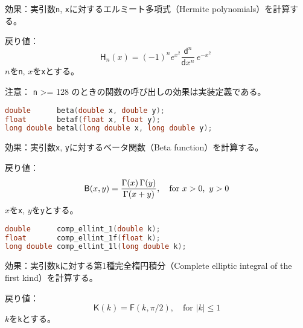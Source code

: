 \noindent
\textsf{効果}：実引数\lstinline!n!,
\lstinline!x!に対するエルミート多項式（Hermite polynomials）を計算する。

\noindent
\textsf{戻り値}：
\[
  \mathsf{H}_n(x) =
  (-1)^n e^{x^2} \frac{ \mathsf{d} ^n}
              { \mathsf{d}x^n} \, e^{-x^2}
\;
\]
\hspace*{3em}\(n\)を\lstinline!n!, \(x\)を\lstinline!x!とする。

\noindent
\textsf{注意}： \lstinline!n! \textgreater{}= 128
のときの関数の呼び出しの効果は実装定義である。

%

\bgroup
\begin{lstlisting}[language=C++, aboveskip=0.0zw]
double      beta(double x, double y);
float       betaf(float x, float y);
long double betal(long double x, long double y);
\end{lstlisting}
\egroup

\noindent
\textsf{効果}：実引数\lstinline!x!,
\lstinline!y!に対するベータ関数（Beta function）を計算する。

\noindent
\textsf{戻り値}：
\[
  \mathsf{B}(x, y) =
  \frac{ \Gamma(x) \, \Gamma(y) }
       { \Gamma(x+y) },
       \quad \mbox{for $x > 0$,\, $y > 0$}
\]
\hspace*{3em}\(x\)を\lstinline!x!, \(y\)を\lstinline!y!とする。

%

\bgroup
\begin{lstlisting}[language=C++, aboveskip=0.0zw]
double      comp_ellint_1(double k);
float       comp_ellint_1f(float k);
long double comp_ellint_1l(long double k);
\end{lstlisting}
\egroup

\noindent
\textsf{効果}：実引数\lstinline!k!に対する第1種完全楕円積分（Complete
elliptic integral of the first kind）を計算する。

\noindent
\textsf{戻り値}：
\[
  \mathsf{K}(k) =
  \mathsf{F}(k, \pi / 2),
              \quad \mbox{for $|k| \le 1$}
\]
\hspace*{3em}\(k\)を\lstinline!k!とする。

